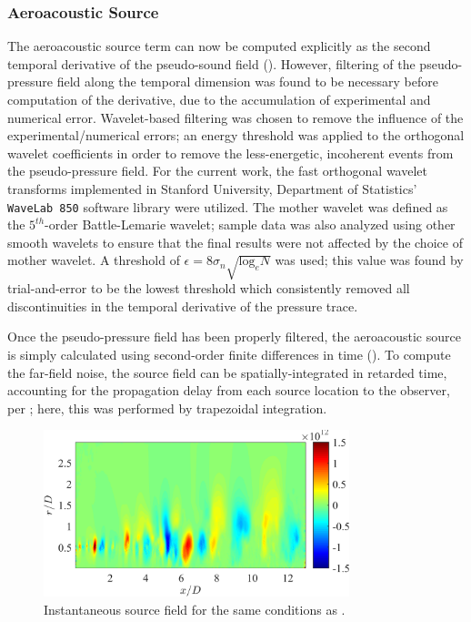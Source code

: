 \subsubsection{Aeroacoustic Source}
The aeroacoustic source term can now be computed explicitly as the second temporal derivative of the pseudo-sound field ().
However, filtering of the pseudo-pressure field along the temporal dimension was found to be necessary before computation of the derivative, due to the accumulation of experimental and numerical error.
Wavelet-based filtering was chosen to remove the influence of the experimental/numerical errors; an energy threshold was applied to the orthogonal wavelet coefficients in order to remove the less-energetic, incoherent events from the pseudo-pressure field.
For the current work, the fast orthogonal wavelet transforms implemented in Stanford University, Department of Statistics' \texttt{WaveLab 850} software library were utilized.
The mother wavelet was defined as the $5^{th}$-order Battle-Lemarie wavelet; sample data was also analyzed using other smooth wavelets to ensure that the final results were not affected by the choice of mother wavelet.
A threshold of $\epsilon = 8 \sigma_n \sqrt{ \mathrm{log}_e N}$ was used; this value was found by trial-and-error to be the lowest threshold which consistently removed all discontinuities in the temporal derivative of the pressure trace.

Once the pseudo-pressure field has been properly filtered, the aeroacoustic source is simply calculated using second-order finite differences in time ().
To compute the far-field noise, the source field can be spatially-integrated in retarded time, accounting for the propagation delay from each source location to the observer, per ; here, this was performed by trapezoidal integration. 
\begin{figure}
	\centering
	\includegraphics[width = 3.5in]{Figures/ch5_valid_Inst_source.png}
	\caption{Instantaneous source field for the same conditions as .}
	\label{fig:valid_source}
\end{figure}

